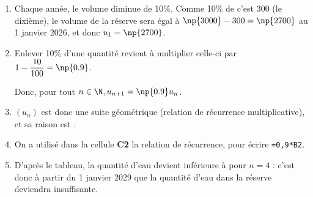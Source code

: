%
%
%

\begin{enumerate}
  \item 
Chaque année, le volume diminue de 10\%. Comme 10\% de  c'est 300 (le dixième), le volume de la réserve sera égal à \mbox{$\np{3000}-300=\np{2700}$} au 1 janvier 2026, et donc \mbox{$u_1=\np{2700}$}.
  \item 
Enlever 10\% d'une quantité revient à multiplier celle-ci par \mbox{$1-\dfrac{10}{100}=\np{0.9}$}.

Donc, pour tout \mbox{$n \in \N, u_{n+1}=\np{0.9}u_n$}.
  \item 
\mbox{$(u_n)$} est donc une suite géométrique (relation de récurrence multiplicative), et sa raison est .
  \item 
%
%
On a utilisé dans la cellule \textbf{C2} la relation de récurrence, pour écrire \texttt{=0,9*B2}.
  \item 
%
D'après le tableau, la quantité d'eau devient inférieure à  pour \mbox{$n=4$} : c'est donc à partir du 1 janvier 2029 que la quantité d’eau dans la réserve deviendra insuffisante.
\end{enumerate}  

